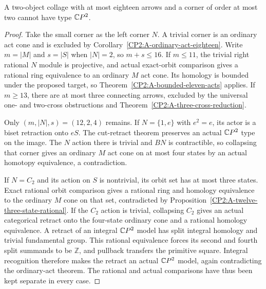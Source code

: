 \begin{proposition}
\label{CP2:A-two-object-small-corner-eighteen}
A two-object collage with at most eighteen arrows and a
corner of order at most two cannot have type $\mathbb{C}P^2$.
\end{proposition}
\begin{proof}
Take the small corner as the left corner $N$. A trivial
corner is an ordinary act cone and is excluded by
Corollary~\ref{CP2:A-ordinary-act-eighteen}. Write $m=|M|$
and $s=|S|$ when $|N|=2$, so $m+s\leq16$.
If $m\leq11$, the trivial right rational $N$ module is
projective, and actual exact-orbit comparison gives a
rational ring equivalence to an ordinary $M$ act cone.
Its homology is bounded under the proposed target, so
Theorem~\ref{CP2:A-bounded-eleven-acts} applies. If
$m\geq13$, there are at most three connecting arrows,
excluded by the universal one- and two-cross obstructions
and Theorem~\ref{CP2:A-three-cross-reduction}.

Only $(m,|N|,s)=(12,2,4)$ remains. If $N=\{1,e\}$ with
$e^2=e$, its actor is a biset retraction onto $eS$. The
cut-retract theorem preserves an actual $\mathbb{C}P^2$ type on
the image. The $N$ action there is trivial and $BN$ is
contractible, so collapsing that corner gives an ordinary
$M$ act cone on at most four states by an actual homotopy
equivalence, a contradiction.

If $N=C_2$ and its action on $S$ is nontrivial, its orbit
set has at most three states. Exact rational orbit comparison
gives a rational ring and homology equivalence to the
ordinary $M$ cone on that set, contradicted by
Proposition~\ref{CP2:A-twelve-three-state-rational}. If the
$C_2$ action is trivial, collapsing $C_2$ gives an actual
categorical retract onto the four-state ordinary cone and
a rational homology equivalence. A retract of an integral
$\mathbb{C}P^2$ model has split integral homology and trivial
fundamental group. This rational equivalence forces its
second and fourth split summands to be $\mathbb Z$, and
pullback transfers the primitive square. Integral recognition
therefore makes the retract an actual $\mathbb{C}P^2$ model, again
contradicting the ordinary-act theorem. The rational and
actual comparisons have thus been kept separate in every
case.
\end{proof}

